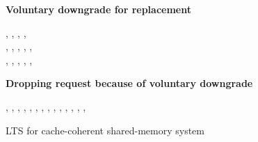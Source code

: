 \begin{figure*}
\begin{boxedminipage}[c]{.95\textwidth}
\textbf{Voluntary downgrade for replacement}

{
{\dt, \ch, \s, \dst,\\ \wt, \dwt, \inp, \outp}
{\dt, \ch[(c, p,\resp) \coloneqq (a, \s(c,a), x,\\ \;\;\;\;
\ite{\s(c,a) = M}{\dt(c,a)}{\_}) \uplus \ch(c,p,\resp)], \\ \s[(c,a)\coloneqq x], \dst,
\wt, \dwt, \inp, \outp}}

\textbf{Dropping request because of voluntary downgrade}

{
{\dt, \ch, \s, \dst, \wt, \dwt, \inp, \outp}
{\dt, \ch[(p,c) \coloneqq \rs], \s, \dst,
\wt, \dwt, \inp, \outp}}
\end{boxedminipage}

\caption{LTS for cache-coherent shared-memory system}
\label{cache}
\end{figure*}
